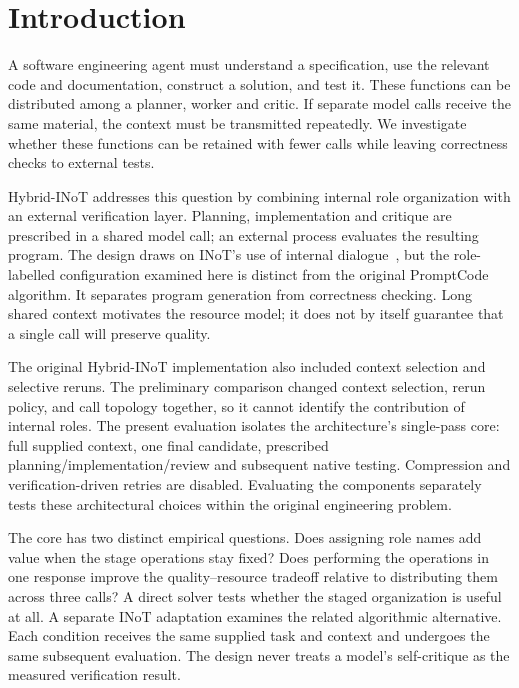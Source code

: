 \section{Introduction}
\label{sec:heldout-context}
A software engineering agent must understand a specification, use the relevant code and documentation, construct a solution, and test it. These functions can be distributed among a planner, worker and critic. If separate model calls receive the same material, the context must be transmitted repeatedly. We investigate whether these functions can be retained with fewer calls while leaving correctness checks to external tests.

Hybrid-INoT addresses this question by combining internal role organization with an external verification layer. Planning, implementation and critique are prescribed in a shared model call; an external process evaluates the resulting program. The design draws on INoT's use of internal dialogue~\cite{sun2025inot}, but the role-labelled configuration examined here is distinct from the original PromptCode algorithm. It separates program generation from correctness checking. Long shared context motivates the resource model; it does not by itself guarantee that a single call will preserve quality.

The original Hybrid-INoT implementation also included context selection and selective reruns. The preliminary comparison changed context selection, rerun policy, and call topology together, so it cannot identify the contribution of internal roles. The present evaluation isolates the architecture's single-pass core: full supplied context, one final candidate, prescribed planning/implementation/review and subsequent native testing. Compression and verification-driven retries are disabled. Evaluating the components separately tests these architectural choices within the original engineering problem.

The core has two distinct empirical questions. Does assigning role names add value when the stage operations stay fixed? Does performing the operations in one response improve the quality--resource tradeoff relative to distributing them across three calls? A direct solver tests whether the staged organization is useful at all. A separate INoT adaptation examines the related algorithmic alternative. Each condition receives the same supplied task and context and undergoes the same subsequent evaluation. The design never treats a model's self-critique as the measured verification result.

